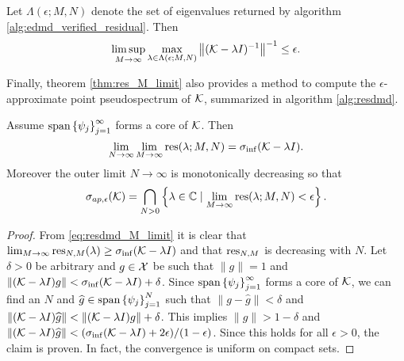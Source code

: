 \begin{corollary}
    Let $\Lambda (\epsilon; M, N)$ denote the set of eigenvalues returned by algorithm 
    \ref{alg:edmd_verified_residual}. Then 
    \begin{equation}
        \limsup_{M \to \infty} \max_{\lambda \in \Lambda (\epsilon; M, N)}
        \left\| (\mathcal{K} - \lambda I)^{-1} \right\|^{-1} \leq \epsilon . 
    \end{equation}
\end{corollary}

Finally, theorem \ref{thm:res_M_limit} also provides a method to compute the 
$\epsilon$-approximate point pseudospectrum of $\mathcal{K}$, summarized in 
algorithm \ref{alg:resdmd}. 

\begin{corollary}
    \label{cor:K_ap_epsilon}
    Assume $\text{span} \left\{ \psi_j \right\}_{j=1}^\infty$ forms a core of $\mathcal{K}$. 
    Then
    \begin{equation}
        \lim_{N \to \infty} \lim_{M \to \infty} \text{res} (\lambda; M, N) 
        = \sigma_{\inf} (\mathcal{K} - \lambda I) . 
    \end{equation}
    Moreover the outer limit $N \to \infty$ is monotonically decreasing so that 
    \begin{equation}
        \sigma_{ap, \epsilon} (\mathcal{K}) = 
        \bigcap_{N > 0} \left\{ \lambda \in \mathbb{C} \mid 
        \lim_{M \to \infty} \text{res} (\lambda; M, N) < \epsilon \right\} . 
    \end{equation}
\end{corollary}

\begin{proof}
    From \ref{eq:resdmd_M_limit} it is clear that 
    $\lim_{M \to \infty} \text{res}_{N,M} (\lambda) \geq \sigma_{\inf} (\mathcal{K} - \lambda I)$
    and that $\text{res}_{N,M}$ is decreasing with $N$. Let $\delta > 0$ be arbitrary and 
    $g \in \mathcal{X}$ be such that $\|g\|=1$ and 
    $\left\| (\mathcal{K} - \lambda I) g \right\| < \sigma_{\inf} (\mathcal{K} - \lambda I) + \delta$. 
    Since $\text{span} \left\{ \psi_j \right\}_{j=1}^\infty$ forms a core of $\mathcal{K}$, 
    we can find an $N$ and $\widehat{g} \in \text{span} \left\{ \psi_j \right\}_{j=1}^N$ 
    such that $\| g - \widehat{g} \| < \delta$ and 
    $\left\| (\mathcal{K} - \lambda I) \widehat{g} \right\| < 
    \left\| (\mathcal{K} - \lambda I) g \right\| + \delta$. This implies 
    $\| \widehat{g} \| > 1- \delta$ and $\left\| (\mathcal{K} - \lambda I) \widehat{g} \right\| < 
    (\sigma_{\inf} (\mathcal{K} - \lambda I) + 2\epsilon) / (1 - \epsilon)$. Since this holds 
    for all $\epsilon > 0$, the claim is proven. In fact, the convergence is uniform on 
    compact sets. 
\end{proof}

